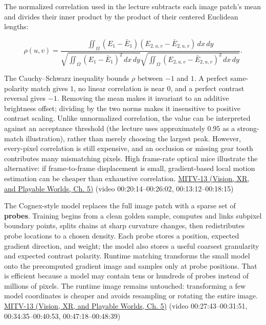 The normalized correlation used in the lecture subtracts each image patch's mean and divides their inner product by the product of their centered Euclidean lengths:

\[
\rho(u,v)=\frac{\iint_\Omega (E_1-\bar E_1)(E_{2,u,v}-\bar E_{2,u,v})\,dx\,dy}{\sqrt{\iint_\Omega(E_1-\bar E_1)^2\,dx\,dy}\sqrt{\iint_\Omega(E_{2,u,v}-\bar E_{2,u,v})^2\,dx\,dy}}.
\]

The Cauchy--Schwarz inequality bounds \(\rho\) between \(-1\) and \(1\). A perfect same-polarity match gives \(1\), no linear correlation is near \(0\), and a perfect contrast reversal gives \(-1\). Removing the mean makes it invariant to an additive brightness offset; dividing by the two norms makes it insensitive to positive contrast scaling. Unlike unnormalized correlation, the value can be interpreted against an acceptance threshold (the lecture uses approximately \(0.95\) as a strong-match illustration), rather than merely choosing the largest peak. However, every-pixel correlation is still expensive, and an occlusion or missing gear tooth contributes many mismatching pixels. High frame-rate optical mice illustrate the alternative: if frame-to-frame displacement is small, gradient-based local motion estimation can be cheaper than exhaustive correlation. \href{../07-Vision-XR-and-Playable-Worlds/main.pdf\#nameddest=04-visual-computing-ii-ch036-mitv-13---object-detection-recognition-and-pose-determination-patquick-us-7016539}{MITV-13 (Vision, XR, and Playable Worlds, Ch. 5)} (video 00:20:14--00:26:02, 00:13:12--00:18:15)

The Cognex-style model replaces the full image patch with a sparse set of \textbf{probes}. Training begins from a clean golden sample, computes and links subpixel boundary points, splits chains at sharp curvature changes, then redistributes probe locations to a chosen density. Each probe stores a position, expected gradient direction, and weight; the model also stores a useful coarsest granularity and expected contrast polarity. Runtime matching transforms the small model onto the precomputed gradient image and samples only at probe positions. That is efficient because a model may contain tens or hundreds of probes instead of millions of pixels. The runtime image remains untouched: transforming a few model coordinates is cheaper and avoids resampling or rotating the entire image. \href{../07-Vision-XR-and-Playable-Worlds/main.pdf\#nameddest=04-visual-computing-ii-ch036-mitv-13---object-detection-recognition-and-pose-determination-patquick-us-7016539}{MITV-13 (Vision, XR, and Playable Worlds, Ch. 5)} (video 00:27:43--00:31:51, 00:34:35--00:40:53, 00:47:18--00:48:39)

